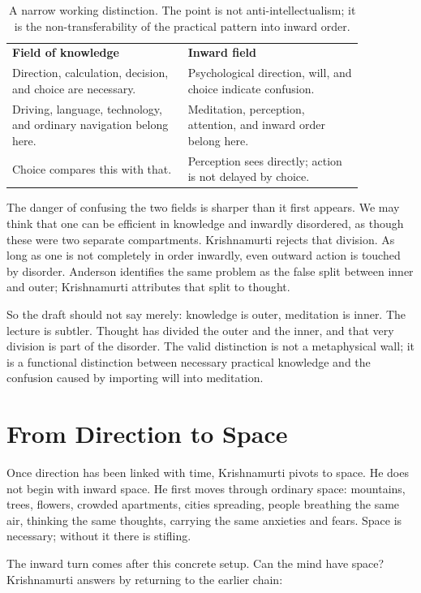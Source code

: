 \begin{table}
\centering
\begin{tabular}{p{0.43\linewidth} p{0.43\linewidth}}
\textbf{Field of knowledge} & \textbf{Inward field} \\
Direction, calculation, decision, and choice are necessary. & Psychological direction, will, and choice indicate confusion. \\
Driving, language, technology, and ordinary navigation belong here. & Meditation, perception, attention, and inward order belong here. \\
Choice compares this with that. & Perception sees directly; action is not delayed by choice. \\
\end{tabular}
\caption{A narrow working distinction. The point is not anti-intellectualism; it is the non-transferability of the practical pattern into inward order.}
\end{table}

The danger of confusing the two fields is sharper than it first appears. We may think that one can be efficient in knowledge and inwardly disordered, as though these were two separate compartments. Krishnamurti rejects that division. As long as one is not completely in order inwardly, even outward action is touched by disorder. Anderson identifies the same problem as the false split between inner and outer; Krishnamurti attributes that split to thought.

So the draft should not say merely: knowledge is outer, meditation is inner. The lecture is subtler. Thought has divided the outer and the inner, and that very division is part of the disorder. The valid distinction is not a metaphysical wall; it is a functional distinction between necessary practical knowledge and the confusion caused by importing will into meditation.

\section{From Direction to Space}

Once direction has been linked with time, Krishnamurti pivots to space. He does not begin with inward space. He first moves through ordinary space: mountains, trees, flowers, crowded apartments, cities spreading, people breathing the same air, thinking the same thoughts, carrying the same anxieties and fears. Space is necessary; without it there is stifling.

The inward turn comes after this concrete setup. Can the mind have space? Krishnamurti answers by returning to the earlier chain:

